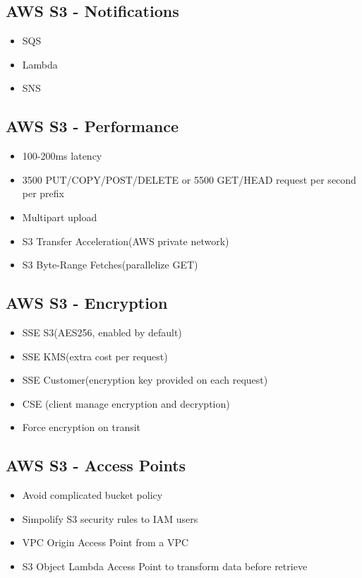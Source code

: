 \documentclass[../main.tex]{subfiles}
\begin{document}
\subsection{AWS S3 - Notifications}
\begin{itemize}
    \item SQS
    \item Lambda
    \item SNS
\end{itemize}

\subsection{AWS S3 - Performance}
\begin{itemize}
    \item 100-200ms latency
    \item 3500 PUT/COPY/POST/DELETE or 5500 GET/HEAD request per second per prefix
    \item Multipart upload
    \item S3 Transfer Acceleration(AWS private network)
    \item S3 Byte-Range Fetches(parallelize GET)
\end{itemize}

\subsection{AWS S3 - Encryption}
\begin{itemize}
    \item SSE S3(AES256, enabled by default)
    \item SSE KMS(extra cost per request)
    \item SSE Customer(encryption key provided on each request)
    \item CSE (client manage encryption and decryption)
    \item Force encryption on transit
\end{itemize}

\subsection{AWS S3 - Access Points}
\begin{itemize}
    \item Avoid complicated bucket policy
    \item Simpolify S3 security rules to IAM users
    \item VPC Origin Access Point from a VPC
    \item S3 Object Lambda Access Point to transform data before retrieve
\end{itemize}
\end{document}
